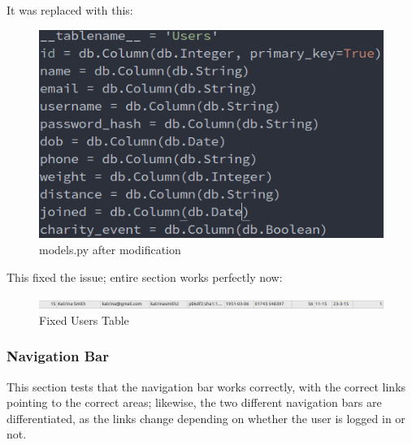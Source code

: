\documentclass{article}[12pt,a4paper]
\begin{document}
It was replaced with this:

\begin{figure}[h!]
    \includegraphics[scale=0.5]{images/testing/add_user/code_after}
    \caption{models.py after modification}
\end{figure}

This fixed the issue; entire section works perfectly now:

\begin{figure}[h!]
    \includegraphics[scale=0.33]{images/testing/add_user/database_fixed}
    \caption{Fixed Users Table}
\end{figure}

\subsubsection{Navigation Bar}
This section tests that the navigation bar works correctly, with the correct links pointing to the correct areas; likewise, the two different navigation bars are differentiated, as the links change depending on whether the user is logged in or not.
\end{document}

